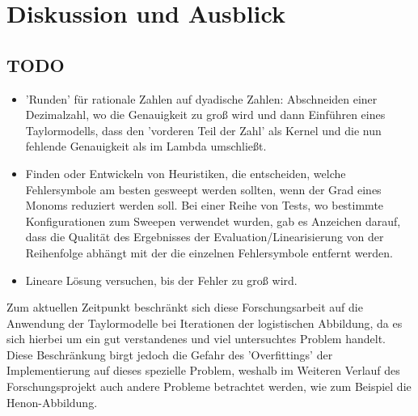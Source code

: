 
\chapter{Diskussion und Ausblick}
\label{ch:fazit}
\section{TODO}
\begin{itemize}
    \item 'Runden' für rationale Zahlen auf dyadische Zahlen: Abschneiden einer Dezimalzahl, wo die Genauigkeit zu groß wird und dann Einführen eines Taylormodells, dass den 'vorderen Teil der Zahl' als Kernel und die nun fehlende Genauigkeit als im Lambda umschließt.
    \item Finden oder Entwickeln von Heuristiken, die entscheiden, welche Fehlersymbole am besten gesweept werden sollten, wenn der Grad eines Monoms reduziert werden soll. Bei einer Reihe von Tests, wo bestimmte Konfigurationen zum Sweepen verwendet wurden, gab es Anzeichen darauf, dass die Qualität des Ergebnisses der Evaluation/Linearisierung von der Reihenfolge abhängt mit der die einzelnen Fehlersymbole entfernt werden.
    \item Lineare Lösung versuchen, bis der Fehler zu groß wird.
\end{itemize}

Zum aktuellen Zeitpunkt beschränkt sich diese Forschungsarbeit auf die Anwendung der Taylormodelle bei Iterationen der logistischen Abbildung, da es sich hierbei um ein gut verstandenes und viel untersuchtes Problem handelt. Diese Beschränkung birgt jedoch die Gefahr des 'Overfittings' der Implementierung auf dieses spezielle Problem, weshalb im Weiteren Verlauf des Forschungsprojekt auch andere Probleme betrachtet werden, wie zum Beispiel die Henon-Abbildung.

